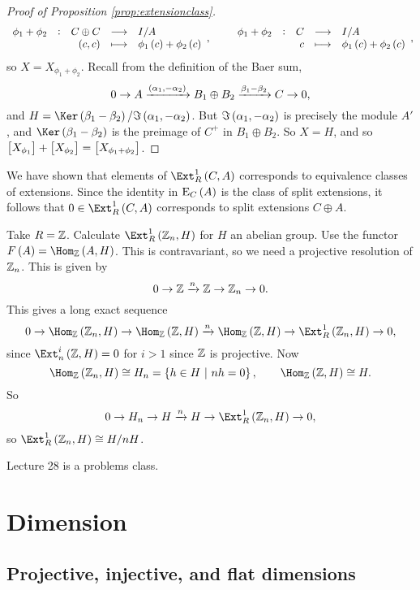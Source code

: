 \begin{proof}[Proof of Proposition \ref{prop:extensionclass}]
$$ \function[\phi_1 + \phi_2]{C \oplus C}{I / A}{\br{c, c}}{\phi_1\br{c} + \phi_2\br{c}}, \qquad \function[\phi_1 + \phi_2]{C}{I / A}{c}{\phi_1\br{c} + \phi_2\br{c}}, $$
so $ X = X_{\phi_1 + \phi_2} $. Recall from the definition of the Baer sum,
$$ 0 \to A \xrightarrow{\br{\alpha_1, -\alpha_2}} B_1 \oplus B_2 \xrightarrow{\beta_1 - \beta_2} C \to 0, $$
and $ H = \Ker \br{\beta_1 - \beta_2} / \Im \br{\alpha_1, -\alpha_2} $. But $ \Im \br{\alpha_1, -\alpha_2} $ is precisely the module $ A' $, and $ \Ker \br{\beta_1 - \beta_2} $ is the preimage of $ C^+ $ in $ B_1 \oplus B_2 $. So $ X = H $, and so $ \sbr{X_{\phi_1}} + \sbr{X_{\phi_2}} = \sbr{X_{\phi_1 + \phi_2}} $.
\end{proof}

\pagebreak

We have shown that elements of $ \Ext_R^1\br{C, A} $ corresponds to equivalence classes of extensions. Since the identity in $ \E_C\br{A} $ is the class of split extensions, it follows that $ 0 \in \Ext_R^1\br{C, A} $ corresponds to split extensions $ C \oplus A $.

\begin{example*}
Take $ R = \mathbb{Z} $. Calculate $ \Ext_R^1\br{\ZZ_n, H} $ for $ H $ an abelian group. Use the functor $ F\br{A} = \Hom_\ZZ\br{A, H} $. This is contravariant, so we need a projective resolution of $ \mathbb{Z}_n $. This is given by
$$ 0 \to \mathbb{Z} \xrightarrow{n} \mathbb{Z} \to \mathbb{Z}_n \to 0. $$
This gives a long exact sequence
$$ 0 \to \Hom_\ZZ\br{\ZZ_n, H} \to \Hom_\ZZ\br{\ZZ, H} \xrightarrow{n} \Hom_\ZZ\br{\ZZ, H} \to \Ext_R^1\br{\ZZ_n, H} \to 0, $$
since $ \Ext_n^i\br{\ZZ, H} = 0 $ for $ i > 1 $ since $ \mathbb{Z} $ is projective. Now
$$ \Hom_\ZZ\br{\ZZ_n, H} \cong H_n = \cbr{h \in H \st nh = 0}, \qquad \Hom_\ZZ\br{\ZZ, H} \cong H. $$
So
$$ 0 \to H_n \to H \xrightarrow{n} H \to \Ext_R^1\br{\ZZ_n, H} \to 0, $$
so $ \Ext_R^1\br{\ZZ_n, H} \cong H / nH $.
\end{example*}


Lecture 28 is a problems class.

\pagebreak

\section{Dimension}

\subsection{Projective, injective, and flat dimensions}

